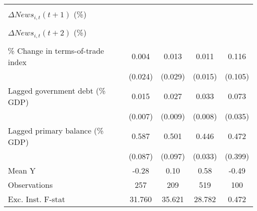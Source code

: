 {\begin{tabular}{l*{4}{c}}
                    &                     &                     &                     &                     \\
\addlinespace
$ \Delta News_{i,t}(t+1)$ (\%)&                     &                     &                     &                     \\
                    &                     &                     &                     &                     \\
\addlinespace
$ \Delta News_{i,t}(t+2)$ (\%)&                     &                     &                     &                     \\
                    &                     &                     &                     &                     \\
\addlinespace
\% Change in terms-of-trade index&       0.004         &       0.013         &       0.011         &       0.116         \\
                    &     (0.024)         &     (0.029)         &     (0.015)         &     (0.105)         \\
\addlinespace
Lagged government debt (\% GDP)&       0.015\sym{**} &       0.027\sym{***}&       0.033\sym{***}&       0.073\sym{**} \\
                    &     (0.007)         &     (0.009)         &     (0.008)         &     (0.035)         \\
\addlinespace
Lagged primary balance (\% GDP)&       0.587\sym{***}&       0.501\sym{***}&       0.446\sym{***}&       0.472         \\
                    &     (0.087)         &     (0.097)         &     (0.033)         &     (0.399)         \\
\midrule
Mean Y              &       -0.28         &        0.10         &        0.58         &       -0.49         \\
Observations        &         257         &         209         &         519         &         100         \\
Exc. Inst. F-stat   &      31.760         &      35.621         &      28.782         &       0.472         \\
\bottomrule
\end{tabular}
}

